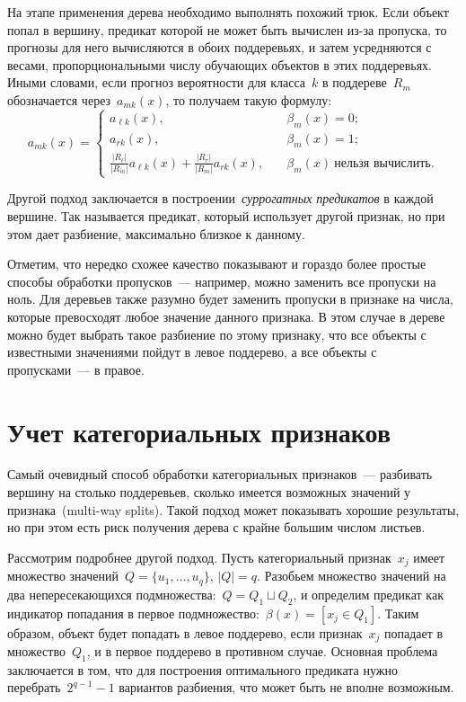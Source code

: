 \documentclass[12pt,fleqn]{article}
\begin{document}
На этапе применения дерева необходимо выполнять похожий трюк.
Если объект попал в вершину, предикат которой не может быть вычислен из-за пропуска,
то прогнозы для него вычисляются в обоих поддеревьях, и затем усредняются
с весами, пропорциональными числу обучающих объектов в этих поддеревьях.
Иными словами, если прогноз вероятности для класса~$k$ в поддереве~$R_m$ обозначается через~$a_{mk}(x)$,
то получаем такую формулу:
\[
    a_{mk}(x)
    =
    \begin{cases}
        a_{\ell k}(x), \quad &\beta_m(x) = 0;\\
        a_{r k}(x), \quad &\beta_m(x) = 1;\\
        \frac{|R_\ell|}{|R_m|} a_{\ell k}(x)
            +
            \frac{|R_r|}{|R_m|} a_{r k}(x),
            \quad
            &\beta_m(x)\ \text{нельзя вычислить}.
    \end{cases}
\]

Другой подход заключается в построении~\emph{суррогатных предикатов} в каждой вершине.
Так называется предикат, который использует другой признак, но при этом дает
разбиение, максимально близкое к данному.

Отметим, что нередко схожее качество показывают и гораздо более простые способы обработки пропусков~---
например, можно заменить все пропуски на ноль.
Для деревьев также разумно будет заменить пропуски в признаке на числа,
которые превосходят любое значение данного признака.
В этом случае в дереве можно будет выбрать такое разбиение по этому признаку,
что все объекты с известными значениями пойдут в левое поддерево, а все объекты с пропусками~--- в правое.

\section{Учет категориальных признаков}
Самый очевидный способ обработки категориальных признаков~--- разбивать вершину на столько поддеревьев,
сколько имеется возможных значений у признака~(multi-way splits).
Такой подход может показывать хорошие результаты, но при этом есть риск получения дерева
с крайне большим числом листьев.

Рассмотрим подробнее другой подход.
Пусть категориальный признак~$x_j$ имеет множество значений~$Q = \{u_1, \dots, u_q\}$, $|Q| = q$.
Разобьем множество значений на два непересекающихся подмножества:~$Q = Q_1 \sqcup Q_2$,
и определим предикат как индикатор попадания в первое подмножество:~$\beta(x) = [x_j \in Q_1]$.
Таким образом, объект будет попадать в левое поддерево, если признак~$x_j$ попадает в множество~$Q_1$,
и в первое поддерево в противном случае.
Основная проблема заключается в том, что для построения оптимального предиката
нужно перебрать~$2^{q - 1} - 1$ вариантов разбиения,
что может быть не вполне возможным.
\end{document}
